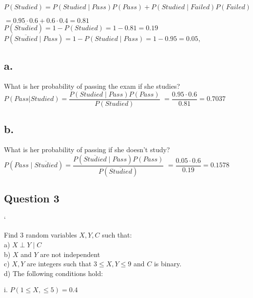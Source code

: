 \documentclass[12pt]{article}
\newcommand\tab[1][1cm]{\hspace*{#1}}
\begin{document}
    $P(Studied) = P(Studied \mid Pass) P(Pass) + P(Studied \mid Failed) P(Failed)$

    $= 0.95 \cdot 0.6 + 0.6 \cdot 0.4= 0.81$ \\

    $P(\overline{Studied}) = 1 - P(Studied) = 1 - 0.81 = 0.19 $\\

    $P(\overline{Studied} \mid Pass) = 1 - P(Studied \mid Pass) = 1 - 0.95 = 0.05$,


    \subsection*{a.}
    What is her probability of passing the exam if she studies?\\

    $P(Pass| Studied) = \dfrac{P(Studied \mid Pass)P(Pass)}{P(Studied)}$
    $ =  \dfrac{0.95 \cdot 0.6}{0.81} = 0.7037 $

    \subsection*{b.}

    What is her probability of passing if she doesn't study? \\

    $P(Pass \mid \overline{Studied}) = \dfrac{P(\overline{Studied} \mid Pass)P(Pass)}{P(\overline{Studied})}$
    $ =  \dfrac{0.05 \cdot 0.6}{0.19} = 0.1578 $

    \newpage

    \begin{center}
        \section*{Question 3}`
    \end{center}
    Find 3 random variables $X, Y, C$ such that:\\


    a) $X \perp Y \mid C $\\

    b) $X$ and $Y$ are not independent \\

    c) $X, Y$ are integers such that $3 \leq X, Y \leq 9$ and $C$ is binary.\\

    d) The following conditions hold:

    \tab i.  $ P(1 \leq X, \leq 5) = 0.4$
\end{document}
